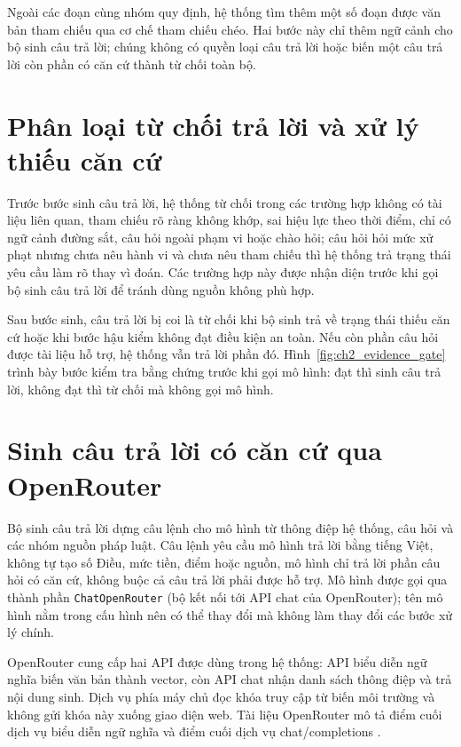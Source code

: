 \documentclass[12pt,a4paper,oneside]{report}
\begin{document}
Ngoài các đoạn cùng nhóm quy định, hệ thống tìm thêm một số đoạn được văn bản tham chiếu qua cơ chế tham chiếu chéo. Hai bước này chỉ thêm ngữ cảnh cho bộ sinh câu trả lời; chúng không có quyền loại câu trả lời hoặc biến một câu trả lời còn phần có căn cứ thành từ chối toàn bộ.


\section{Phân loại từ chối trả lời và xử lý thiếu căn cứ}
Trước bước sinh câu trả lời, hệ thống từ chối trong các trường hợp không có tài liệu liên quan, tham chiếu rõ ràng không khớp, sai hiệu lực theo thời điểm, chỉ có ngữ cảnh đường sắt, câu hỏi ngoài phạm vi hoặc chào hỏi; câu hỏi hỏi mức xử phạt nhưng chưa nêu hành vi và chưa nêu tham chiếu thì hệ thống trả trạng thái yêu cầu làm rõ thay vì đoán. Các trường hợp này được nhận diện trước khi gọi bộ sinh câu trả lời để tránh dùng nguồn không phù hợp.

Sau bước sinh, câu trả lời bị coi là từ chối khi bộ sinh trả về trạng thái thiếu căn cứ hoặc khi bước hậu kiểm không đạt điều kiện an toàn. Nếu còn phần câu hỏi được tài liệu hỗ trợ, hệ thống vẫn trả lời phần đó.
Hình~\ref{fig:ch2_evidence_gate} trình bày bước kiểm tra bằng chứng trước khi gọi mô hình: đạt thì sinh câu trả lời, không đạt thì từ chối mà không gọi mô hình.

\section{Sinh câu trả lời có căn cứ qua OpenRouter}
Bộ sinh câu trả lời dựng câu lệnh cho mô hình từ thông điệp hệ thống, câu hỏi và các nhóm nguồn pháp luật. Câu lệnh yêu cầu mô hình trả lời bằng tiếng Việt, không tự tạo số Điều, mức tiền, điểm hoặc nguồn, mô hình chỉ trả lời phần câu hỏi có căn cứ, không buộc cả câu trả lời phải được hỗ trợ. Mô hình được gọi qua thành phần \texttt{ChatOpenRouter} (bộ kết nối tới API chat của OpenRouter); tên mô hình nằm trong cấu hình nên có thể thay đổi mà không làm thay đổi các bước xử lý chính.

OpenRouter cung cấp hai API được dùng trong hệ thống: API biểu diễn ngữ nghĩa biến văn bản thành vector, còn API chat nhận danh sách thông điệp và trả nội dung sinh. Dịch vụ phía máy chủ đọc khóa truy cập từ biến môi trường và không gửi khóa này xuống giao diện web. Tài liệu OpenRouter mô tả điểm cuối dịch vụ biểu diễn ngữ nghĩa và điểm cuối dịch vụ chat/completions \cite{openrouter_embeddings_docs,openrouter_chat_docs}.
\end{document}
